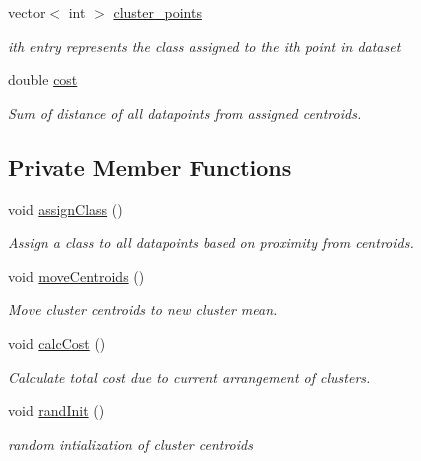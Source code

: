 \begin{DoxyCompactItemize}
\mbox{\label{classKMClassifier_a63a2f43c9ae76ed02708fd003ade29ef}} 
vector$<$ int $>$ \hyperlink{classKMClassifier_a63a2f43c9ae76ed02708fd003ade29ef}{cluster\+\_\+points}
\begin{DoxyCompactList}\small\item\em ith entry represents the class assigned to the ith point in dataset \end{DoxyCompactList}\item 
\mbox{\label{classKMClassifier_ae5ff4fcca2d28dd3ad353cf07d1c8f95}} 
double \hyperlink{classKMClassifier_ae5ff4fcca2d28dd3ad353cf07d1c8f95}{cost}
\begin{DoxyCompactList}\small\item\em Sum of distance of all datapoints from assigned centroids. \end{DoxyCompactList}\end{DoxyCompactItemize}
\subsection*{Private Member Functions}
\begin{DoxyCompactItemize}
\item 
\mbox{\label{classKMClassifier_afd8966241632351a9d691a9c231eab8e}} 
void \hyperlink{classKMClassifier_afd8966241632351a9d691a9c231eab8e}{assign\+Class} ()
\begin{DoxyCompactList}\small\item\em Assign a class to all datapoints based on proximity from centroids. \end{DoxyCompactList}\item 
\mbox{\label{classKMClassifier_a37b8a890fe45e646791118899e2cbddf}} 
void \hyperlink{classKMClassifier_a37b8a890fe45e646791118899e2cbddf}{move\+Centroids} ()
\begin{DoxyCompactList}\small\item\em Move cluster centroids to new cluster mean. \end{DoxyCompactList}\item 
\mbox{\label{classKMClassifier_acead805cb0d025965fe334b6f2799cc3}} 
void \hyperlink{classKMClassifier_acead805cb0d025965fe334b6f2799cc3}{calc\+Cost} ()
\begin{DoxyCompactList}\small\item\em Calculate total cost due to current arrangement of clusters. \end{DoxyCompactList}\item 
\mbox{\label{classKMClassifier_a91d2ea2aefdf7f33a95f7b8f1ca88961}} 
void \hyperlink{classKMClassifier_a91d2ea2aefdf7f33a95f7b8f1ca88961}{rand\+Init} ()
\begin{DoxyCompactList}\small\item\em random intialization of cluster centroids \end{DoxyCompactList}\end{DoxyCompactItemize}

